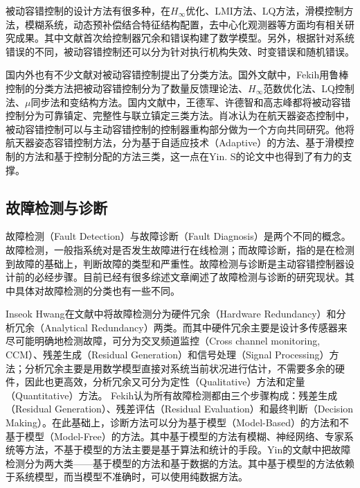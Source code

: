 \documentclass{article}
\begin{document}
被动容错控制的设计方法有很多种，在$H_\infty$优化\cite{119629,7850999}、LMI方法\cite{7795198,974340,1236798}、LQ方法\cite{VEILLETTE1995137,847106,866928}，滑模控制方法\cite{4160860}，模糊系统\cite{7795198,7505963,Zha20173267}，动态预补偿结合特征结构配置\cite{Jiang2000Design,ZHAO19981267}，去中心化观测器\cite{70346}等方面均有相关研究成果。其中文献\cite{ZHAO19981267}首次给控制器冗余和错误构建了数学模型。另外，根据针对系统错误的不同，被动容错控制还可以分为针对执行机构失效\cite{ZHAO19981267,974340,VEILLETTE1995137,1236798,Tian20101907,Li20132455,7353144,7863042,70346,866928}、时变错误\cite{7850999,CHEN2004349,6064886}和随机错误\cite{7795198,7505963,5540530,Zha20173267}。

国内外也有不少文献对被动容错控制提出了分类方法。国外文献中，Fekih\cite{6859271}用鲁棒控制的分类方法把被动容错控制分为了数量反馈理论法、$H_\infty$范数优化法\cite{4079591}、LQ控制法\cite{Staroswiecki20072070}、$\mu$同步法和变结构方法。国内文献中，王德军\cite{wangdejun2014}、许德智\cite{xudezhi2013}和高志峰\cite{gaozhifeng2011}都将被动容错控制分为可靠镇定、完整性与联立镇定三类方法。肖冰\cite{xiaobing2014}认为在航天器姿态控制中，被动容错控制可以与主动容错控制的控制器重构部分做为一个方向共同研究。他将航天器姿态容错控制方法，分为基于自适应技术（Adaptive）的方法、基于滑模控制的方法和基于控制分配的方法三类，这一点在Yin. S的论文中\cite{7407616}也得到了有力的支撑。

\subsection{故障检测与诊断}\label{subsec:fdd}
故障检测（Fault Detection）与故障诊断（Fault Diagnosis）是两个不同的概念。故障检测，一般指系统对是否发生故障进行在线检测；而故障诊断，指的是在检测到故障的基础上，判断故障的类型和严重性。故障检测与诊断是主动容错控制器设计前的必经步骤。目前已经有很多综述文章阐述了故障检测与诊断的研究现状\cite{Venkatasubramanian2003293,6859271,Zhang2008229,7407616,6423903,Marzat2012modelbased,Jiang201260,5282515,Venkatasubramanian2003293,Venkatasubramanian2003A}。其中具体对故障检测的分类也有一些不同。

Inseok Hwang\cite{5282515}在文献中将故障检测分为硬件冗余（Hardware Redundancy）和分析冗余（Analytical Redundancy）两类。而其中硬件冗余主要是设计多传感器来尽可能明确地检测故障，可分为交叉频道监控（Cross channel monitoring, CCM）、残差生成（Residual Generation）和信号处理（Signal Processing）方法；分析冗余主要是用数学模型直接对系统当前状况进行估计，不需要多余的硬件，因此也更高效，分析冗余又可分为定性（Qualitative）方法和定量（Quantitative）方法。 Fekih\cite{6859271}认为所有故障检测都由三个步骤构成：残差生成（Residual Generation）、残差评估（Residual Evaluation）和最终判断（Decision Making）。在此基础上，诊断方法可以分为基于模型（Model-Based）的方法和不基于模型（Model-Free）的方法。其中基于模型的方法有模糊、神经网络、专家系统等方法\cite{Patan2008Artificial}，不基于模型的方法主要是基于算法和统计的手段。Yin\cite{7407616}的文献中把故障检测分为两大类——基于模型的方法和基于数据的方法。其中基于模型的方法依赖于系统模型，而当模型不准确时，可以使用纯数据方法。
\end{document}
